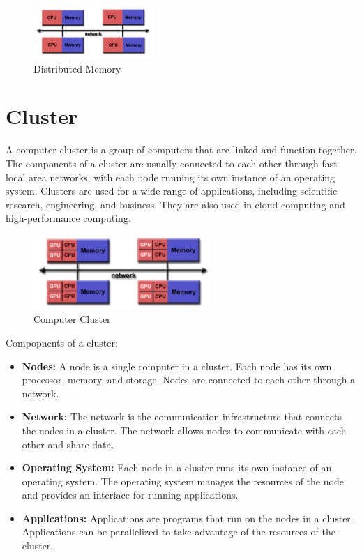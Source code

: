 \begin{itemize}
    \begin{figure}[H]
        \centering
        \includegraphics[width=0.4\textwidth]{assets/fig20.png}
        \caption{Distributed Memory}
    \end{figure}
\end{itemize}

\section{Cluster}

A computer cluster is a group of computers that are linked and function
together. The components of a cluster are usually connected to each other
through fast local area networks, with each node running its own instance
of an operating system. Clusters are used for a wide range of applications,
including scientific research, engineering, and business. They are
also used in cloud computing and high-performance computing.

\begin{figure}[H]
    \centering
    \includegraphics[width=0.6\textwidth]{assets/fig21.png}
    \caption{Computer Cluster}
\end{figure}

Compopnents of a cluster:
\begin{itemize}
    \item \textbf{Nodes:} A node is a single computer in a cluster. Each node has its own processor, memory, and storage. Nodes are connected to each other through a network.
    \item \textbf{Network:} The network is the communication infrastructure that connects the nodes in a cluster. The network allows nodes to communicate with each other and share data.
    \item \textbf{Operating System:} Each node in a cluster runs its own instance of an operating system. The operating system manages the resources of the node and provides an interface for running applications.
    \item \textbf{Applications:} Applications are programs that run on the nodes in a cluster. Applications can be parallelized to take advantage of the resources of the cluster.
\end{itemize}

